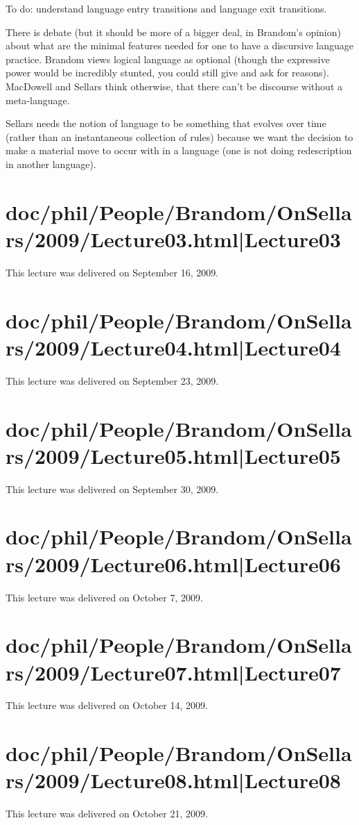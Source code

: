 \documentclass[12pt,a4paper]{report}
\begin{document}
To do: understand language entry transitions and language exit transitions.

There is debate (but it should be more of a bigger deal, in Brandom's opinion) about what are the minimal features needed for one to have a discursive language practice. Brandom views logical language as optional (though the expressive power would be incredibly stunted, you could still give and ask for reasons). MacDowell and Sellars think otherwise, that there can't be discourse without a meta-language.

Sellars needs the notion of language to be something that evolves over time (rather than an instantaneous collection of rules) because we want the decision to make a material move to occur with in a language (one is not doing redescription in another language).
\section{doc/phil/People/Brandom/OnSellars/2009/Lecture03.html|Lecture03}
This lecture was delivered on September 16, 2009.

\section{doc/phil/People/Brandom/OnSellars/2009/Lecture04.html|Lecture04}
This lecture was delivered on September 23, 2009.

\section{doc/phil/People/Brandom/OnSellars/2009/Lecture05.html|Lecture05}
This lecture was delivered on September 30, 2009.

\section{doc/phil/People/Brandom/OnSellars/2009/Lecture06.html|Lecture06}
This lecture was delivered on October 7, 2009.

\section{doc/phil/People/Brandom/OnSellars/2009/Lecture07.html|Lecture07}
This lecture was delivered on October 14, 2009.

\section{doc/phil/People/Brandom/OnSellars/2009/Lecture08.html|Lecture08}
This lecture was delivered on October 21, 2009.
\end{document}
